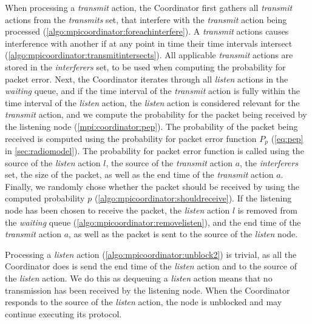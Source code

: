 When processing a \textit{transmit} action, the Coordinator first gathers all \textit{transmit} actions from
the \textit{transmits} set, that interfere with the \textit{transmit} action being processed
(\autoref{algo:mpicoordinator:foreachinterfere}). A \textit{transmit} actions causes interference with
another if at any point in time their time intervals intersect
(\autoref{algo:mpicoordinator:transmitintersects}). All applicable \textit{transmit} actions are stored in the
\textit{interferers} set, to be used when computing the probability for packet error. Next, the Coordinator
iterates through all \textit{listen} actions in the \textit{waiting} queue, and if the time interval of the
\textit{transmit} action is fully within the time interval of the \textit{listen} action, the \textit{listen}
action is considered relevant for the \textit{transmit} action, and we compute the probability for the packet
being received by the listening node (\autoref{mpi:coordinator:pep}). The probability of the packet being
received is computed using the probability for packet error function $P_p$ (\autoref{eq:pep} in
\autoref{sec:radiomodel}). The probability for packet error function is called using the source of the
\textit{listen} action $l$, the source of the \textit{transmit} action $a$, the \textit{interferers} set, the
size of the packet, as well as the end time of the \textit{transmit} action $a$. Finally, we randomly chose
whether the packet should be received by using the computed probability $p$
(\autoref{algo:mpicoordinator:shouldreceive}). If the listening node has been chosen to receive the packet,
the \textit{listen} action $l$ is removed from the \textit{waiting} queue
(\autoref{algo:mpicoordinator:removelisten}), and the end time of the \textit{transmit} action $a$, as well as
the packet is sent to the source of the \textit{listen} node. \medbreak

Processing a \textit{listen} action (\autoref{algo:mpicoordinator:unblock2}) is trivial, as all the
Coordinator does is send the end time of the \textit{listen} action and \KwNull to the source of the
\textit{listen} action. We do this as dequeuing a \textit{listen} action means that no transmission has been
received by the listening node. When the Coordinator responds to the source of the \textit{listen} action,
the node is unblocked and may continue executing its protocol. \medbreak

